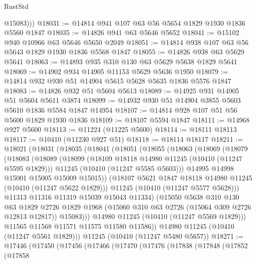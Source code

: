 \begin{lexlean}{RustStd}
\begin{coremodule}
          @15083)))
@18031 := @14814 @941 @107 @63 @56 @5654 @1829 @1930 @1836 @5560 @1847
@18035 := @14826 @941 @63 @5646 @5652
@18041 := @15102 @940 @10966 @63 @5646 @5650 @2049
@18051 := @14814 @938 @107 @63 @56 @5643 @1829 @1930 @1836 @5568 @1847
@18055 := @14826 @938 @63 @5629 @5641
@18063 := @14893 @935 @310 @130 @63 @5629 @5638 @1829 @5641
@18069 := @14902 @934 @14905 @11153 @5629 @5636 @1950
@18079 := @14814 @932 @930 @51 @14904 @5615 @5628 @5635 @1836 @5576 @1847
@18083 := @14826 @932 @51 @5604 @5613
@18089 := @14925 @931 @14905 @51 @5604 @5611 @3874
@18099 := @14932 @930 @51 @14904 @3855 @5603 @5610 @1836 @5584 @1847 @14954
@18107 := @14814 @928 @107 @51 @56 @5600 @1829 @1930 @1836
@18109 := @18107 @5594 @1847
@18111 := @14968 @927 @5600
@18113 := @11224 (@11225 @5600)
@18114 := @18111 @18113
@18117 := @10410 (@11230 @927 @51)
@18118 := @18114 @18117
@18211 := @18021
    (@18031
      (@18035
        (@18041
          (@18051
            (@18055
              (@18063
                (@18069
                  (@18079
                    (@18083
                      (@18089
                        (@18099
                          (@18109 @18118 @14980 @11245 (@10410 (@11247 @5595 @1829)))
                          @11245
                          (@10410 (@11247 @5585 @5603)))
                        @14995
                        @14998
                        @15001
                        @15005
                        @15009
                        @15015))
                    (@18107 @5621 @1847 @18118 @14980 @11245 (@10410 (@11247 @5622 @1829)))
                    @11245
                    (@10410 (@11247 @5577 @5628)))
                  @11313
                  @11316
                  @11319
                  @15039
                  @15043
                  @11334)
                (@15050
                  @5638
                  @310
                  @130
                  @63
                  @1829
                  @2726
                  @1829
                  @1968
                  (@15060 @310 @63 @2726 (@15064 @309 @2726 @12813 @12817))
                  @15083)))
            @14980
            @11245
            (@10410 (@11247 @5569 @1829)))
          @11565
          @11568
          @11571
          @11575
          @11580
          @11586))
      @14980
      @11245
      (@10410 (@11247 @5561 @1829)))
    @11245
    (@10410 (@11247 @5480 @5657))
@18271 := @17446
    (@17450
      (@17456
        (@17466
          (@17470
            (@17476
              (@17838
                (@17848
                  (@17852
                    (@17858

\end{coremodule}
\end{lexlean}
